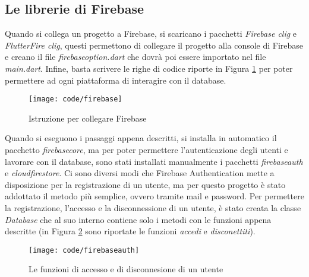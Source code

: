 \newpage

\subsection{Le librerie di Firebase}
Quando si collega un progetto a Firebase, si scaricano i pacchetti \emph{Firebase \gls{clig}} e \emph{FlutterFire \gls{clig}}, questi permettono di collegare il progetto alla console di Firebase e creano il file \emph{firebase\textunderscore option.dart} che dovrà poi essere importato nel file \emph{main.dart}.\newline
Infine, basta scrivere le righe di codice riporte in Figura \ref{fig:code-firebase} per poter permettere ad ogni piattaforma di interagire con il database.
\begin{figure}[!h] 
    \centering 
    \texttt{[image: code/firebase]} 
    \caption{Istruzione per collegare Firebase}
    \label{fig:code-firebase}
\end{figure}

Quando si eseguono i passaggi appena descritti, si installa in automatico il pacchetto \emph{firebase\textunderscore core}, ma per poter permettere l'autenticazione degli utenti e lavorare con il database, sono stati installati manualmente i pacchetti \emph{firebase\textunderscore auth} e \emph{cloud\textunderscore firestore}.\newline
\newline
Ci sono diversi modi che Firebase Authentication mette a disposizione per la registrazione di un utente, ma per questo progetto è stato addottato il metodo più semplice, ovvero tramite mail e password.\newline
Per permettere la registrazione, l'accesso e la disconnessione di un utente, è stato creata la classe \emph{Database} che al suo interno contiene solo i metodi con le funzioni appena descritte (in Figura \ref{fig:code-authentication} sono riportate le funzioni \emph{accedi} e \emph{disconettiti}).
\begin{figure}[!h] 
    \centering 
    \texttt{[image: code/firebaseauth]} 
    \caption{Le funzioni di accesso e di disconnesione di un utente}
    \label{fig:code-authentication}
\end{figure}

\newpage

